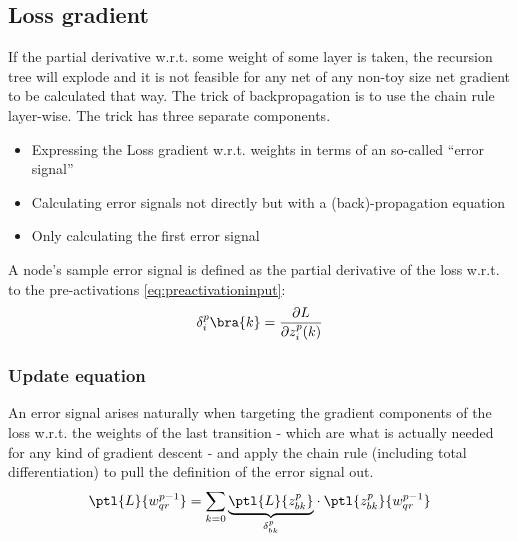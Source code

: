 \subsection{Loss gradient}
If the partial derivative w.r.t. some weight of some layer is taken, the recursion tree will explode and it is not feasible for any net of any non-toy size net gradient to be calculated that way. The trick of backpropagation is to use the chain rule layer-wise. The trick has three separate components.
\begin{itemize}[]\item Expressing the Loss gradient w.r.t. weights in terms of an so-called \enquote{error signal}
	\item Calculating error signals not directly but with a (back)-propagation equation
	\item Only calculating the first error signal
\end{itemize}


A node's sample error signal is defined as the partial derivative of the loss w.r.t. to the pre-activations \eqref{eq:preactivationinput}:
\begin{align}
	\delta^p_i\bra{k}=\frac{\partial L}{\partial z_i^p(k)}
\end{align}
\subsubsection{Update equation}
An error signal arises naturally when targeting the gradient components of the loss w.r.t. the weights of the last transition - which are what is actually needed for any kind of gradient descent - and apply the chain rule (including total differentiation) to pull the definition of the error signal out.
\begin{align}
	\label{eq:chainrule-error-signal}
	\ptl{L}{w_{qr}^{p-1}}=\sum\limits_{k=0}\underset{\delta_{bk}^p}{\underbrace{\ptl{L}{z_{bk}^p}}}\cdot\ptl{z_{bk}^p}{w_{qr}^{p-1}}
\end{align}

